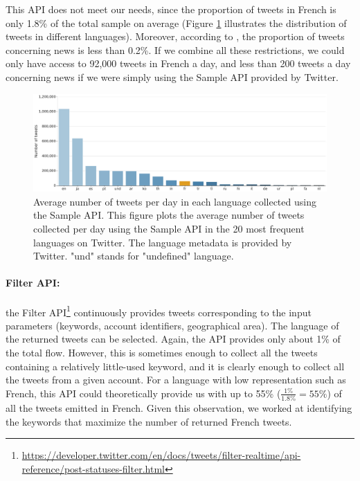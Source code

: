 This API does not meet our needs, since the proportion of tweets in French is only 1.8\% of the total sample on average
(Figure \ref{Figure:HistogramLanguages} illustrates the distribution of tweets in different languages). Moreover, according to \citet{liu_reuters_2016}, the proportion of tweets concerning news is less than 0.2\%. If we combine all these restrictions, we could only have access to 92,000 tweets in French a day, and less than 200 tweets a day concerning news if we were simply using the Sample API provided by Twitter.


\begin{figure}
\begin{center}
\includegraphics[width=1\textwidth]{figures/HistogramLanguages.pdf}
\end{center}

\caption[Average number of tweets per day in each language collected using the Sample API]{Average number of tweets per day in each language collected using the Sample API. This figure plots the average number of tweets collected  per day using the Sample API in the 20 most frequent languages on Twitter. The language metadata is provided by Twitter. "und" stands for "undefined" language.}
\label{Figure:HistogramLanguages}
\end{figure}


\paragraph{Filter API:}

the Filter API\footnote{\url{https://developer.twitter.com/en/docs/tweets/filter-realtime/api-reference/post-statuses-filter.html}} continuously provides tweets corresponding to the input parameters (keywords, account identifiers, geographical area). The language of the returned tweets can be selected. Again, the API provides only about 1\% of the total flow. However, this is sometimes enough to collect all the tweets containing a relatively little-used keyword, and it is clearly enough to collect all the tweets from a given account. For a language with low representation such as French, this API could theoretically provide us with up to 55\% ($\frac{1\%}{1.8\%} = 55\%$) of all the tweets emitted in French. Given this observation, we worked at identifying the keywords that maximize the number of returned French tweets.


